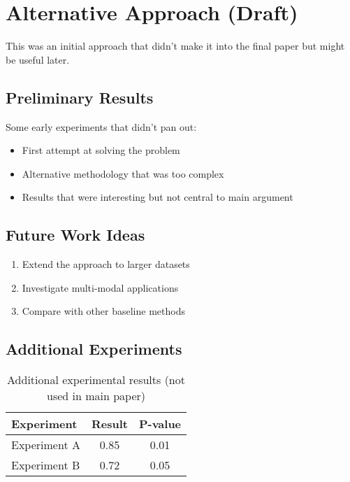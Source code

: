 
\section{Alternative Approach (Draft)}
This was an initial approach that didn't make it into the final paper but might be useful later.

\subsection{Preliminary Results}
Some early experiments that didn't pan out:
\begin{itemize}
    \item First attempt at solving the problem
    \item Alternative methodology that was too complex
    \item Results that were interesting but not central to main argument
\end{itemize}

\subsection{Future Work Ideas}
\begin{enumerate}
    \item Extend the approach to larger datasets
    \item Investigate multi-modal applications
    \item Compare with other baseline methods
\end{enumerate}


\subsection{Additional Experiments}

\begin{table}[h]
\centering
\begin{tabular}{@{}lcc@{}}
\toprule
Experiment & Result & P-value \\
\midrule
Experiment A & 0.85 & 0.01 \\
Experiment B & 0.72 & 0.05 \\
\bottomrule
\end{tabular}
\caption{Additional experimental results (not used in main paper)}
\end{table} 